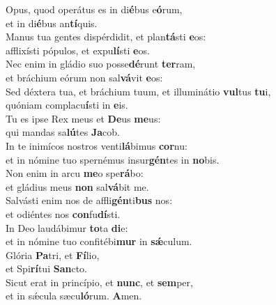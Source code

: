 \evenverse Opus, quod operátus es in di\textbf{é}bus e\textbf{ó}rum,~\*\\
\evenverse et in di\textbf{é}bus an\textbf{tí}quis.\\
\oddverse Manus tua gentes dispérdidit, et plan\textbf{tá}sti \textbf{e}os:~\*\\
\oddverse afflixísti pópulos, et expu\textbf{lí}sti \textbf{e}os.\\
\evenverse Nec enim in gládio suo posse\textbf{dé}runt \textbf{ter}ram,~\*\\
\evenverse et bráchium eórum non sal\textbf{vá}vit \textbf{e}os:\\
\oddverse Sed déxtera tua, et bráchium tuum, et illuminátio \textbf{vul}tus \textbf{tu}i,~\*\\
\oddverse quóniam complacu\textbf{í}sti in \textbf{e}is.\\
\evenverse Tu es ipse Rex meus et \textbf{De}us \textbf{me}us:~\*\\
\evenverse qui mandas sa\textbf{lú}tes \textbf{Ja}cob.\\
\oddverse In te inimícos nostros venti\textbf{lá}bimus \textbf{cor}nu:~\*\\
\oddverse et in nómine tuo spernémus insur\textbf{gén}tes in \textbf{no}bis.\\
\evenverse Non enim in arcu \textbf{me}o spe\textbf{rá}bo:~\*\\
\evenverse et gládius meus \textbf{non} sal\textbf{vá}bit me.\\
\oddverse Salvásti enim nos de affli\textbf{gén}ti\textbf{bus} nos:~\*\\
\oddverse et odiéntes nos \textbf{con}fu\textbf{dí}sti.\\
\evenverse In Deo laudábimur \textbf{to}ta \textbf{di}e:~\*\\
\evenverse et in nómine tuo confitébi\textbf{mur} in \textbf{sǽ}culum.\\
\oddverse Glória \textbf{Pa}tri, et \textbf{Fí}lio,~\*\\
\oddverse et Spi\textbf{rí}tui \textbf{San}cto.\\
\evenverse Sicut erat in princípio, et \textbf{nunc}, et \textbf{sem}per,~\*\\
\evenverse et in sǽcula sæcu\textbf{ló}rum. \textbf{A}men.\\

